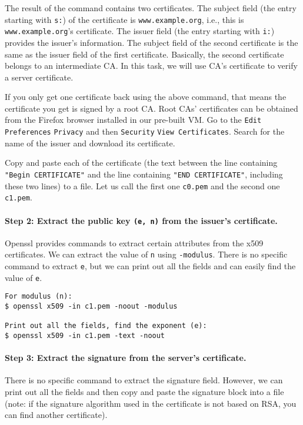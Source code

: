 The result of the command contains two certificates. The subject field (the entry starting with
\texttt{s:})  of the certificate is \texttt{www.example.org}, i.e.,
this is \texttt{www.example.org}'s certificate. The issuer field (the entry starting with
\texttt{i:}) provides the issuer's information. The subject field of the second certificate
is the same as the issuer field of the first certificate. Basically, the second certificate
belongs to an intermediate CA. In this task, we will use CA's certificate to
verify a server certificate.

If you only get one certificate back using the above command, that means the certificate you
get is signed by a root CA. Root CAs' certificates can be obtained from the Firefox browser
installed in our pre-built VM.  Go to the \texttt{Edit}  \texttt{Preferences}
 \texttt{Privacy}  and then \texttt{Security}  \texttt{View Certificates}.
Search for the name of the issuer and download its certificate.

Copy and paste each of the certificate (the text between the line
containing \texttt{"Begin CERTIFICATE"} and the line
containing \texttt{"END CERTIFICATE"}, including these two lines) to a file.
Let us call the first one \texttt{c0.pem} and
the second one \texttt{c1.pem}.



\paragraph{Step 2: Extract the public key \texttt{(e, n)} from the issuer's certificate.}
Openssl provides commands to extract certain attributes from the x509 certificates.
We can extract the value of \texttt{n} using \texttt{-modulus}. There is no specific
command to extract \texttt{e}, but we can print out all the fields and can easily
find the value of \texttt{e}.

\begin{lstlisting}
For modulus (n):
$ openssl x509 -in c1.pem -noout -modulus

Print out all the fields, find the exponent (e):
$ openssl x509 -in c1.pem -text -noout
\end{lstlisting}


\paragraph{Step 3: Extract the signature from the server's certificate.}
There is no specific \openssl command to extract the signature field.
However, we can print out all the fields and then copy and paste
the signature block into a file (note:
if the signature algorithm used in the certificate is not based on RSA,
you can find another certificate).


